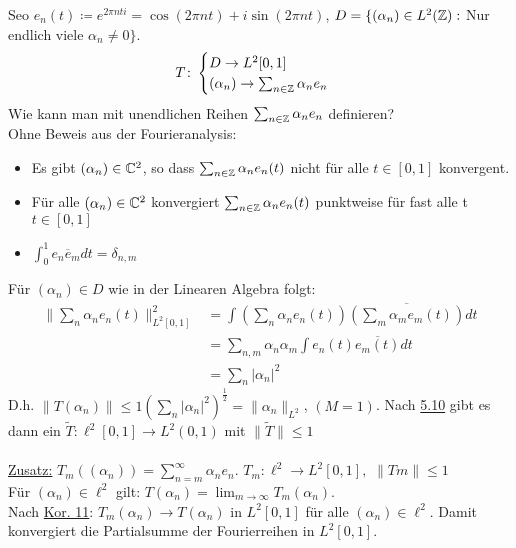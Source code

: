\begin{beispiel}
	Seo $e_{n}(t) \coloneqq e^{2 \pi n t i} = \cos(2 \pi n t) + i \sin(2 \pi n t)$, $D = \{ (\alpha_{n}) \in L^{2}(\mathbb{Z}):$ Nur endlich viele $\alpha_{n} \neq 0 \}$.
	\[ T \colon \begin{cases} D \rightarrow L^{2}[0, 1] \\ (\alpha_{n}) \rightarrow \sum_{n \in \mathbb{Z}} \alpha_{n} e_{n} \end{cases} \]
	Wie kann man mit unendlichen Reihen $\sum_{n \in \mathbb{Z}} \alpha_{n} e_{n}$ definieren? \\
	Ohne Beweis aus der Fourieranalysis:
	\begin{itemize}
		\item Es gibt $(\alpha_{n}) \in \mathbb{C}^{2}$, so dass $\sum_{n \in \mathbb{Z}} \alpha_{n} e_{n}(t)$ nicht für alle $t \in [0, 1]$ konvergent.
		\item Für alle $(\alpha_{n}) \in \mathbb{C}^{2}$ konvergiert $\sum_{n \in \mathbb{Z}} \alpha_{n} e_{n}(t)$ punktweise für fast alle t $t \in [0, 1]$
		\item $\int_{0}^{1} e_{n} \overline e_{m} dt = \delta_{n, m}$
	\end{itemize}
	Für $(\alpha_{n}) \in D$ wie in der Linearen Algebra folgt:
	\begin{align*}
		\| \sum_{n} \alpha_{n} e_{n}(t) \|_{L^{2}[0, 1]}^{2} & = \int (\sum_{n} \alpha_{n} e_{n}(t)) \overline{(\sum_{m} \alpha_{m} e_{m}(t))} dt \\
		& = \sum_{n, m} \alpha_{n} \alpha_{m} \int e_{n}(t) \overline{e_{m}(t)} dt \\
		& = \sum_{n} |\alpha_{n}|^2
	\end{align*}
	D.h. $\| T (\alpha_{n}) \| \leq 1 \left( \sum_{n} |\alpha_{n}|^2 \right)^{\frac{1}{2}} = \| \alpha_{n} \|_{L^{2}}$, $(M = 1)$. Nach \hyperref[prop:5.10]{5.10} gibt es dann ein $\tilde T: \ell^{2}[0, 1] \rightarrow L^{2}(0, 1)$ mit $\| \tilde T \| \leq 1$ \\ \\
	\uline{Zusatz:} $T_{m}((\alpha_{n})) = \sum_{n = m}^{\infty} \alpha_{n} e_{n}$. $T_{m}: \ell^{2} \rightarrow L^{2}[0, 1],$ $\| Tm \| \leq 1$ \\
	Für $(\alpha_{n}) \in \ell^{2}$ gilt: $T (\alpha_{n}) = \lim_{m \rightarrow \infty} T_{m}(\alpha_{n})$. \\
	Nach \hyperref[kor:5.11]{Kor. 11}: $T_{m}(\alpha_{n}) \rightarrow T (\alpha_{n})$ in $L^{2}[0, 1]$ für alle $(\alpha_{n}) \in \ell^{2}$. Damit konvergiert die Partialsumme der Fourierreihen in $L^{2}[0, 1]$.
\end{beispiel}


